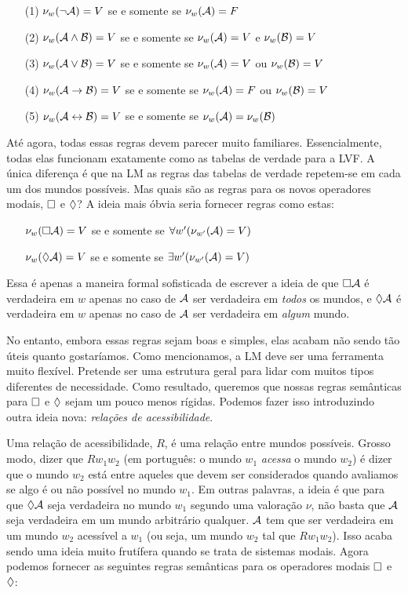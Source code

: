 \begin{itemize}
	\item[(1)]$\nu_w(\neg\mathcal{A})=V$ se e somente se $\nu_w(\mathcal{A})=F$
	\item[(2)]$\nu_w(\mathcal{A}\wedge\mathcal{B})=V$ se e somente se $\nu_w(\mathcal{A})=V$ e $\nu_w(\mathcal{B})=V$
	\item[(3)]$\nu_w(\mathcal{A}\vee\mathcal{B})=V$ se e somente se $\nu_w(\mathcal{A})=V$ ou $\nu_w(\mathcal{B})=V$
	\item[(4)]$\nu_w(\mathcal{A}\rightarrow\mathcal{B})=V$ se e somente se $\nu_w(\mathcal{A})=F$ ou $\nu_w(\mathcal{B})=V$
	\item[(5)]$\nu_w(\mathcal{A}\leftrightarrow\mathcal{B})=V$ se e somente se $\nu_w(\mathcal{A})=\nu_w(\mathcal{B})$  
\end{itemize}
 

Até agora, todas essas regras devem parecer muito familiares. Essencialmente, todas elas funcionam exatamente como as tabelas de verdade para a LVF. A única diferença é que na LM as regras das tabelas de verdade repetem-se em cada um dos mundos possíveis.
Mas quais são as regras para os novos operadores modais, $\Box$ e $\Diamond$? A ideia mais óbvia seria fornecer regras como estas:

\begin{itemize}
	\item[]$\nu_w(\Box \mathcal{A})=V$ se e somente se $\forall w' (\nu_{w'}(\mathcal{A})=V)$
	\item[]$\nu_w(\Diamond \mathcal{A})=V $ se e somente se $\exists w' (\nu_{w'}(\mathcal{A})=V)$
\end{itemize}
Essa é apenas a maneira formal sofisticada de escrever a ideia de que $\Box\mathcal{A}$ é verdadeira em $w$ apenas no caso de $\mathcal{A}$ ser verdadeira em \emph{todos} os mundos, e $\Diamond\mathcal{A}$ é verdadeira em $w$ apenas no caso de $\mathcal{A}$ ser verdadeira em \emph{algum} mundo.

No entanto, embora essas regras sejam boas e simples, elas acabam não sendo tão úteis quanto gostaríamos. Como mencionamos, a LM deve ser uma ferramenta muito flexível. Pretende ser uma estrutura geral para lidar com muitos tipos diferentes de necessidade. Como resultado, queremos que nossas regras semânticas para  $\Box$ e $\Diamond$ sejam um pouco menos rígidas. Podemos fazer isso introduzindo outra ideia nova: \emph{ relações de acessibilidade}.

Uma relação de acessibilidade, $R$, é uma relação entre mundos possíveis. 
Grosso modo, dizer que  $Rw_1w_2$ (em português: o mundo $w_1$ \emph{acessa} o mundo $w_2$) é dizer que o mundo $w_2$ está entre aqueles que devem ser considerados quando avaliamos se algo é ou não possível no mundo $w_1$. Em outras palavras, a ideia é que para que $\Diamond\mathcal{A}$ seja verdadeira no mundo $w_1$ segundo uma valoração $\nu$, não basta que $\mathcal{A}$ seja verdadeira em um mundo arbitrário qualquer. $\mathcal{A}$ tem que ser verdadeira em um mundo $w_2$ acessível a $w_1$ (ou seja, um mundo $w_2$ tal que $Rw_1w_2$).
Isso acaba sendo uma ideia muito frutífera quando se trata de sistemas modais. Agora podemos fornecer as seguintes regras semânticas para os operadores modais $\Box$ e $\Diamond$:

